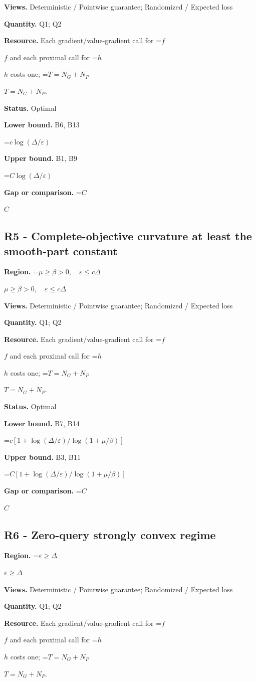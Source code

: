 \documentclass[10pt,a4paper]{article}
\newcommand{\AtlasMath}[1]{\par\begingroup\centering\setbox0=\hbox{$\displaystyle #1$}\ifdim\wd0>1.4\linewidth\typeout{ATLAS WIDE FORMULA: \the\wd0}\fi\ifdim\wd0>\linewidth\resizebox{\linewidth}{!}{\box0}\else\box0\fi\par\endgroup}
\newcommand{\AtlasInlineMath}[1]{\begingroup\setbox0=\hbox{$#1$}\ifdim\wd0>.4\linewidth\endgroup\AtlasMath{#1}\else\endgroup$#1$\fi}
\begin{document}
\textbf{Views.} Deterministic / Pointwise guarantee; Randomized / Expected loss

\textbf{Quantity.} Q1; Q2

\textbf{Resource.} Each gradient/value-gradient call for \AtlasInlineMath{f} and each proximal call for \AtlasInlineMath{h} costs one; \AtlasInlineMath{T=N_G+N_P}.

\textbf{Status.} Optimal

\textbf{Lower bound.} B6, B13

\AtlasMath{c\log(\Delta/\varepsilon)}
\textbf{Upper bound.} B1, B9

\AtlasMath{C\log(\Delta/\varepsilon)}
\textbf{Gap or comparison.} \AtlasInlineMath{C}

\subsection{R5 - Complete-objective curvature at least the smooth-part constant}
\textbf{Region.} \AtlasInlineMath{\mu\ge\beta>0,\quad\varepsilon\le c\Delta}

\textbf{Views.} Deterministic / Pointwise guarantee; Randomized / Expected loss

\textbf{Quantity.} Q1; Q2

\textbf{Resource.} Each gradient/value-gradient call for \AtlasInlineMath{f} and each proximal call for \AtlasInlineMath{h} costs one; \AtlasInlineMath{T=N_G+N_P}.

\textbf{Status.} Optimal

\textbf{Lower bound.} B7, B14

\AtlasMath{c[1+\log(\Delta/\varepsilon)/\log(1+\mu/\beta)]}
\textbf{Upper bound.} B3, B11

\AtlasMath{C[1+\log(\Delta/\varepsilon)/\log(1+\mu/\beta)]}
\textbf{Gap or comparison.} \AtlasInlineMath{C}

\subsection{R6 - Zero-query strongly convex regime}
\textbf{Region.} \AtlasInlineMath{\varepsilon\ge\Delta}

\textbf{Views.} Deterministic / Pointwise guarantee; Randomized / Expected loss

\textbf{Quantity.} Q1; Q2

\textbf{Resource.} Each gradient/value-gradient call for \AtlasInlineMath{f} and each proximal call for \AtlasInlineMath{h} costs one; \AtlasInlineMath{T=N_G+N_P}.
\end{document}
